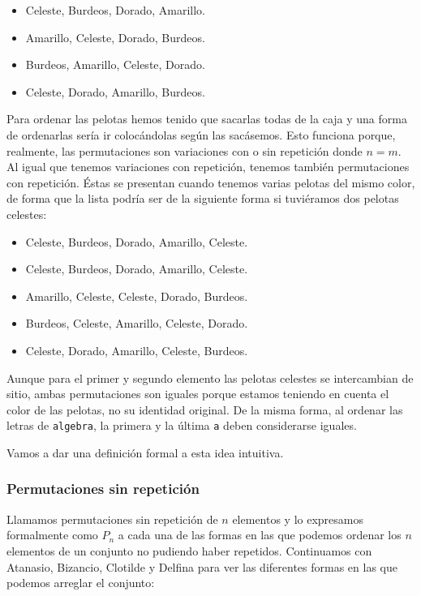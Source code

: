 \begin{itemize}
	\item
		Celeste, Burdeos, Dorado, Amarillo.
	\item
		Amarillo, Celeste, Dorado, Burdeos.
	\item
		Burdeos, Amarillo, Celeste, Dorado.
	\item
		Celeste, Dorado, Amarillo, Burdeos.
\end{itemize}

Para ordenar las pelotas hemos tenido que sacarlas todas de la caja y una forma de ordenarlas sería ir colocándolas según las sacásemos.
Esto funciona porque, realmente, las permutaciones son variaciones con o sin repetición donde $n = m$.
Al igual que tenemos variaciones con repetición, tenemos también permutaciones con repetición.
Éstas se presentan cuando tenemos varias pelotas del mismo color, de forma que la lista podría ser de la siguiente forma si tuviéramos dos pelotas celestes:

\begin{itemize}
	\item
		Celeste, Burdeos, Dorado, Amarillo, Celeste.
	\item
		Celeste, Burdeos, Dorado, Amarillo, Celeste.
	\item
		Amarillo, Celeste, Celeste, Dorado, Burdeos.
	\item
		Burdeos, Celeste, Amarillo, Celeste, Dorado.
	\item
		Celeste, Dorado, Amarillo, Celeste, Burdeos.
\end{itemize}

Aunque para el primer y segundo elemento las pelotas celestes se intercambian de sitio, ambas permutaciones son iguales porque estamos teniendo en cuenta el color de las pelotas, no su identidad original.
De la misma forma, al ordenar las letras de \texttt{algebra}, la primera y la última \texttt{a} deben considerarse iguales.

Vamos a dar una definición formal a esta idea intuitiva.

\subsubsection{Permutaciones sin repetición}

Llamamos permutaciones sin repetición de $n$ elementos y lo expresamos formalmente como $P_n$ a cada una de las formas en las que podemos ordenar los $n$ elementos de un conjunto no pudiendo haber repetidos.
Continuamos con Atanasio, Bizancio, Clotilde y Delfina para ver las diferentes formas en las que podemos arreglar el conjunto:

